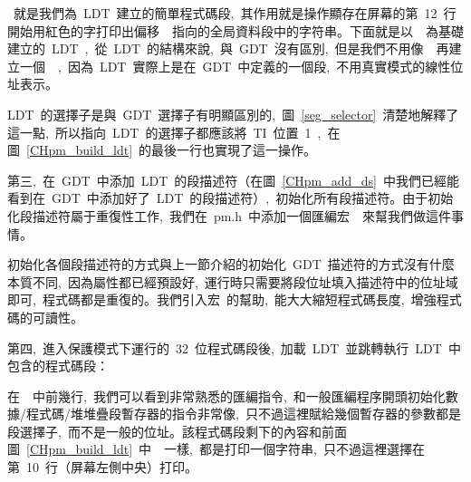~就是我們為~LDT~建立的簡單程式碼段,~其作用就是操作顯存在屏幕的第~12~行開始用紅色的字打印出偏移~~指向的全局資料段中的字符串。下面就是以~~為基礎建立的~LDT~,~從~LDT~的結構來說,~與~GDT~沒有區別,~但是我們不用像~~再建立一個~~,~因為~LDT~實際上是在~GDT~中定義的一個段,~不用真實模式的線性位址表示。

LDT~的選擇子是與~GDT~選擇子有明顯區別的,~圖~\ref{seg_selector}~清楚地解釋了這一點,~所以指向~LDT~的選擇子都應該將~TI~位置~1~,~在圖~\ref{CHpm_build_ldt}~的最後一行也實現了這一操作。

第三,~在~GDT~中添加~LDT~的段描述符（在圖~\ref{CHpm_add_ds}~中我們已經能看到在~GDT~中添加好了~LDT~的段描述符）,~初始化所有段描述符。由于初始化段描述符屬于重復性工作,~我們在~pm.h~中添加一個匯編宏~~來幫我們做這件事情。

\label{CHpm_initdesc}

\label{CHpm_init_dts}

初始化各個段描述符的方式與上一節介紹的初始化~GDT~描述符的方式沒有什麼本質不同,~因為屬性都已經預設好,~運行時只需要將段位址填入描述符中的位址域即可,~程式碼都是重復的。我們引入宏~的幫助,~能大大縮短程式碼長度,~增強程式碼的可讀性。

第四,~進入保護模式下運行的~32~位程式碼段後,~加載~LDT~並跳轉執行~LDT~中包含的程式碼段：

\label{CHpm_run_ldt}

在~~中前幾行,~我們可以看到非常熟悉的匯編指令,~和一般匯編程序開頭初始化數據/程式碼/堆堆疊段暫存器的指令非常像,~只不過這裡賦給幾個暫存器的參數都是段選擇子,~而不是一般的位址。該程式碼段剩下的內容和前面圖~\ref{CHpm_build_ldt}~中~~一樣,~都是打印一個字符串,~只不過這裡選擇在第~10~行（屏幕左側中央）打印。

